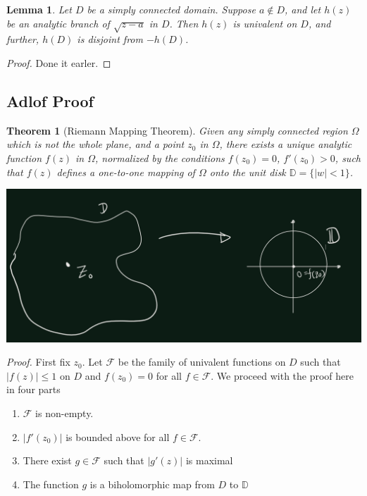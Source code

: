 \documentclass[
]{book}
\providecommand{\tightlist}{%
  \setlength{\itemsep}{0pt}\setlength{\parskip}{0pt}}
\newtheorem{theorem}{Theorem}[chapter]
\newtheorem{lemma}{Lemma}[chapter]
\theoremstyle{definition}
\theoremstyle{definition}
\theoremstyle{definition}
\theoremstyle{definition}
\theoremstyle{remark}
\begin{document}
\begin{lemma}
\protect\hypertarget{lem:unnamed-chunk-44}{}\label{lem:unnamed-chunk-44}Let \(D\) be a simply connected domain. Suppose \(a \notin D\), and let
\(h(z)\) be an analytic branch of \(\sqrt{z - a}\) in \(D\). Then \(h(z)\) is univalent on \(D\), and further, \(h(D)\) is disjoint from \(-h(D)\).
\end{lemma}

\begin{proof}
Done it earler.
\end{proof}

\subsection{Adlof Proof}\label{adlof-proof}

\begin{theorem}[Riemann Mapping Theorem]
\protect\hypertarget{thm:unnamed-chunk-46}{}\label{thm:unnamed-chunk-46}Given any simply connected region \(\Omega\) which is not the whole plane, and a point \(z_0\) in \(\Omega\), there exists a unique analytic function \(f(z)\) in \(\Omega\), normalized by the conditions \(f(z_0) = 0\), \(f'(z_0) > 0\), such that \(f(z)\) defines a one-to-one mapping of \(\Omega\) onto the unit disk \(\mathbb{D}=\{|w| < 1\}\).
\end{theorem}

\begin{center}\includegraphics[width=19.97in]{figures/Riemann_Mapping_Therom/fig4} \end{center}

\emph{Proof.}
First fix \(z_0\). Let \(\mathcal{F}\) be the family of univalent functions on \(D\) such that \(|f(z)|\leq 1\) on \(D\) and \(f(z_0)=0\) for all \(f \in \mathcal{F}\). We proceed with the proof here in four parts

\begin{enumerate}
\def\labelenumi{\roman{enumi}.}
\tightlist
\item
  \(\mathcal{F}\) is non-empty.
\item
  \(|f'(z_0)|\) is bounded above for all \(f\in \mathcal{F}\).
\item
  There exist \(g\in \mathcal{F}\) such that \(|g'(z)|\) is maximal
\item
  The function \(g\) is a biholomorphic map from \(D\) to \(\mathbb{D}\)
\end{enumerate}
\end{document}
